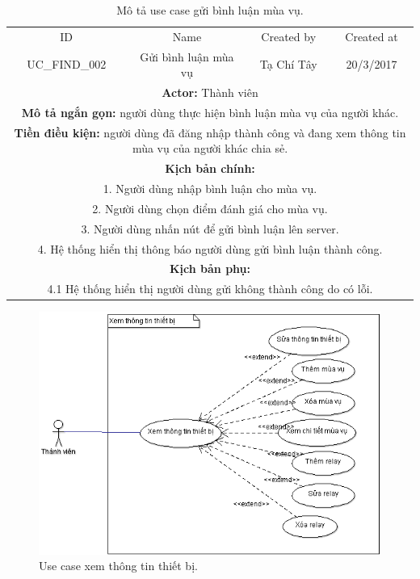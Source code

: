 \documentclass[a4paper,12pt,oneside]{article}
\begin{document}
\begin{table}[!htp]
\centering
\begin{tabularx}{\linewidth}{ |c||c|c|c| }
\hline
ID & Name & Created by & Created at\\
UC\_FIND\_002 & Gửi bình luận mùa vụ & Tạ Chí Tây & 20/3/2017\\
\hline
\multicolumn{4}{|X|}{\textbf{Actor:} Thành viên }\\
\hline
\multicolumn{4}{|X|}{\textbf{Mô tả ngắn gọn:} người dùng thực hiện bình luận mùa vụ của người khác.}\\
\hline
\multicolumn{4}{|X|}{\textbf{Tiền điều kiện:} người dùng đã đăng nhập thành công và đang xem thông tin mùa vụ của người khác chia sẻ.}\\
\hline
\multicolumn{4}{|X|}{\textbf{Kịch bản chính:}}\\
\multicolumn{4}{|X|}{ 
1. Người dùng nhập bình luận cho mùa vụ.}\\
\multicolumn{4}{|X|}{ 
2.	Người dùng chọn điểm đánh giá cho mùa vụ.}\\
\multicolumn{4}{|X|}{
3. Người dùng nhấn nút để gửi bình luận lên server.} \\
\multicolumn{4}{|X|}{
4. Hệ thống hiển thị thông báo người dùng gửi bình luận thành công.}\\
\hline
\multicolumn{4}{|X|}{\textbf{Kịch bản phụ:}}\\
\multicolumn{4}{|X|}{4.1	Hệ thống hiển thị người dùng gửi không thành công do có lỗi.}\\
\hline
\end{tabularx}
\caption{Mô tả use case gửi bình luận mùa vụ.}
\end{table}

\begin{figure}[H]
	\centering
	\includegraphics[scale=.9]{hinh/tttb.png}
	\caption{Use case xem thông tin thiết bị.}
\end{figure}
\end{document}
